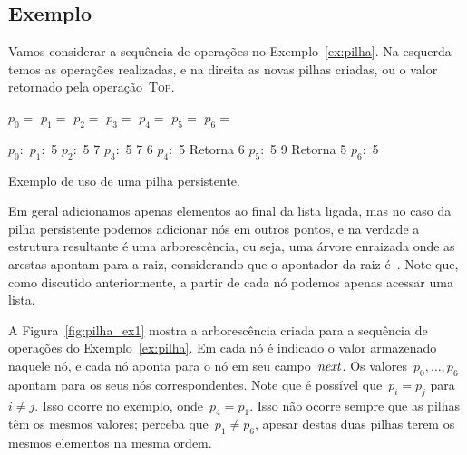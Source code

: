 \documentclass[quali.tex]{subfile}
\begin{document}
\subsection{Exemplo}

Vamos considerar a sequência de operações no Exemplo~\ref{ex:pilha}. Na esquerda temos as operações realizadas, e na direita as novas pilhas criadas, ou o valor retornado pela operação~\textsc{Top}.

\begin{table}
\centering

\begin{subalgorithm}{0.4\textwidth}
\begin{algorithmic}

\State $p_0 =$ 
\State $p_1 =$ 
\State $p_2 =$ 
\State $p_3 =$ 
\State $p_4 =$ 
\State {}
\State $p_5 =$ 
\State {}
\State $p_6 =$ 

\end{algorithmic}
\end{subalgorithm} \vrule
\begin{subalgorithm}{0.4\textwidth}
\begin{algorithmic}

\State $p_0:$
\State $p_1:$ 5
\State $p_2:$ 5 7
\State $p_3:$ 5 7 6
\State $p_4:$ 5
\State Retorna 6
\State $p_5:$ 5 9
\State Retorna 5
\State $p_6:$ 5

\end{algorithmic}
\end{subalgorithm}
\caption{Exemplo de uso de uma pilha persistente.} \label{ex:pilha}
\end{table}

Em geral adicionamos apenas elementos ao final da lista ligada, mas no caso da pilha persistente podemos adicionar nós em outros pontos, e na verdade a estrutura resultante é uma arborescência, ou seja, uma árvore enraizada onde as arestas apontam para a raiz, considerando que o apontador da raiz é~. Note que, como discutido anteriormente, a partir de cada nó podemos apenas acessar uma lista.

A Figura~\ref{fig:pilha_ex1} mostra a arborescência criada para a sequência de operações do Exemplo~\ref{ex:pilha}. Em cada nó é indicado o valor armazenado naquele nó, e cada nó aponta para o nó em seu campo~$\mathit{next}$. Os valores~$p_0, \ldots, p_6$ apontam para os seus nós correspondentes. Note que é possível que~${p_i = p_j}$ para~${i \neq j}$. Isso ocorre no exemplo, onde~$p_4 = p_1$. Isso não ocorre sempre que as pilhas têm os mesmos valores; perceba que~$p_1 \neq p_6$, apesar destas duas pilhas terem os mesmos elementos na mesma ordem.
\end{document}
